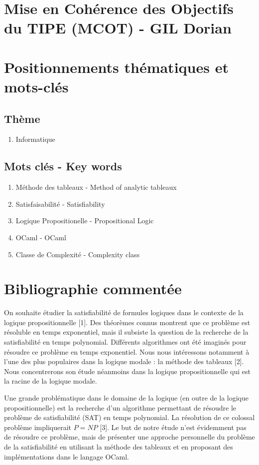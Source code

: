 \documentclass{paper}
\begin{document}
\section*{Mise en Cohérence des Objectifs du TIPE (MCOT) - GIL Dorian}

\section{Positionnements thématiques et mots-clés}
\subsection{Thème}
\begin{enumerate}
    \item Informatique
\end{enumerate}

\subsection{Mots clés - Key words}
\begin{enumerate}
    \item Méthode des tableaux - Method of analytic tableaux
    \item Satisfaisabilité - Satisfiability
    \item Logique Propositionelle - Propositional Logic
    \item OCaml - OCaml
    \item Classe de Complexité - Complexity class
\end{enumerate}

\section{Bibliographie commentée}
On souhaite étudier la satisfiabilité de formules logiques dans le contexte de la logique propositionnelle [1].  Des théorèmes connus montrent que ce
problème est résoluble en temps exponentiel, mais il subsiste la question de la recherche de la satisfiabilité en temps polynomial. Différents
algorithmes ont été imaginés pour résoudre ce problème en temps exponentiel. Nous nous intéressons notamment à l'une des plus populaires dans la
logique modale : la méthode des tableaux [2]. Nous concentrerons son étude néanmoins dans la logique propositionnelle qui est la racine de la logique 
modale.

Une grande problématique dans le domaine de la logique (en outre de la logique propositionnelle) est la recherche d'un algorithme permettant de 
résoudre le problème de satisfiabilité (SAT) en temps polynomial. La résolution de ce colossal problème impliquerait $P=NP$ [3]. Le but de notre étude
n'est évidemment pas de résoudre ce problème, mais de présenter une approche personnelle du problème de la satisfiabilité en utilisant la méthode des
tableaux et en proposant des implémentations dans le langage OCaml.
\end{document}
